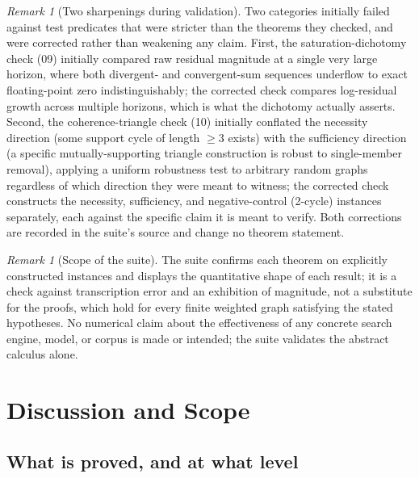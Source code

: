 \documentclass[11pt,twocolumn,a4paper]{article}
\theoremstyle{thmstyle}
\theoremstyle{definition}
\theoremstyle{remark}
\newtheorem{remark}[theorem]{Remark}
\begin{document}
\begin{remark}[Two sharpenings during validation]
\label{rem:val-sharpenings}
Two categories initially failed against test predicates that were
stricter than the theorems they checked, and were corrected rather than
weakening any claim. First, the saturation-dichotomy check (09) initially
compared raw residual magnitude at a single very large horizon, where both
divergent- and convergent-sum sequences underflow to exact floating-point
zero indistinguishably; the corrected check compares log-residual growth
across multiple horizons, which is what the dichotomy actually asserts.
Second, the coherence-triangle check (10) initially conflated the
necessity direction (some support cycle of length $\ge3$ exists) with the
sufficiency direction (a specific mutually-supporting triangle
construction is robust to single-member removal), applying a uniform
robustness test to arbitrary random graphs regardless of which direction
they were meant to witness; the corrected check constructs the necessity,
sufficiency, and negative-control (2-cycle) instances separately, each
against the specific claim it is meant to verify. Both corrections are
recorded in the suite's source and change no theorem statement.
\end{remark}

\begin{remark}[Scope of the suite]
\label{rem:val-scope}
The suite confirms each theorem on explicitly constructed instances and
displays the quantitative shape of each result; it is a check against
transcription error and an exhibition of magnitude, not a substitute for
the proofs, which hold for every finite weighted graph satisfying the
stated hypotheses. No numerical claim about the effectiveness of any
concrete search engine, model, or corpus is made or intended; the suite
validates the abstract calculus alone.
\end{remark}



\section{Discussion and Scope}
\label{sec:discussion}

\subsection{What is proved, and at what level}
\end{document}

